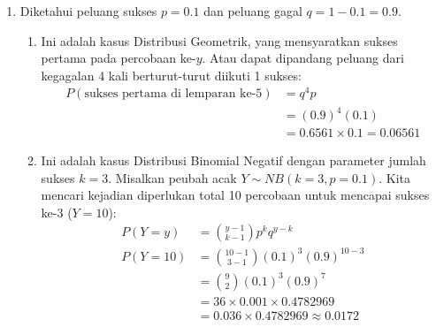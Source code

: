 \documentclass[11pt,letterpaper]{article}
\begin{document}
\begin{enumerate}
  \item Diketahui peluang sukses $p = 0.1$ dan peluang gagal $q = 1 - 0.1 = 0.9$.
        \begin{enumerate}[label=\alph*.]
          \item Ini adalah kasus Distribusi Geometrik, yang mensyaratkan sukses pertama pada percobaan ke-$y$. Atau dapat dipandang peluang dari kegagalan 4 kali berturut-turut diikuti 1 sukses:
                \begin{align*}
                  P(\text{sukses pertama di lemparan ke-5}) & = q^4 p                       \\
                                                            & = (0.9)^4 (0.1)               \\
                                                            & = 0.6561 \times 0.1 = 0.06561
                \end{align*}
          \item Ini adalah kasus Distribusi Binomial Negatif dengan parameter jumlah sukses $k=3$. Misalkan peubah acak $Y \sim NB(k=3, p=0.1)$. Kita mencari kejadian diperlukan total 10 percobaan untuk mencapai sukses ke-3 ($Y=10$):
                \begin{align*}
                  P(Y = y)  & = \binom{y-1}{k-1} p^k q^{y-k}           \\
                  P(Y = 10) & = \binom{10-1}{3-1} (0.1)^3 (0.9)^{10-3} \\
                            & = \binom{9}{2} (0.1)^3 (0.9)^7           \\
                            & = 36 \times 0.001 \times 0.4782969       \\
                            & = 0.036 \times 0.4782969 \approx 0.0172
                \end{align*}
        \end{enumerate}
\end{enumerate}
\end{document}
